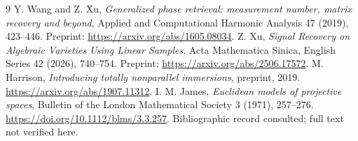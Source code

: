 \documentclass[11pt]{article}
\theoremstyle{remark}\newtheorem{remark}[theorem]{Remark}
\begin{document}
\begin{thebibliography}{9}
 Y. Wang and Z. Xu, \emph{Generalized phase retrieval: measurement number, matrix recovery and beyond}, Applied and Computational Harmonic Analysis 47 (2019), 423--446. Preprint: \url{https://arxiv.org/abs/1605.08034}.
 Z. Xu, \emph{Signal Recovery on Algebraic Varieties Using Linear Samples}, Acta Mathematica Sinica, English Series 42 (2026), 740--754. Preprint: \url{https://arxiv.org/abs/2506.17572}.
 M. Harrison, \emph{Introducing totally nonparallel immersions}, preprint, 2019. \url{https://arxiv.org/abs/1907.11312}.
 I. M. James, \emph{Euclidean models of projective spaces}, Bulletin of the London Mathematical Society 3 (1971), 257--276. \url{https://doi.org/10.1112/blms/3.3.257}. Bibliographic record consulted; full text not verified here.
\end{thebibliography}
\end{document}
